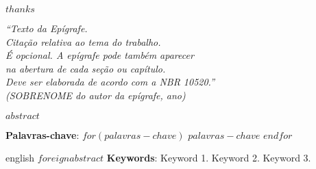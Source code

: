 \documentclass[
	12pt,				%
	oneside,			%
	a4paper,			%
	chapter=TITLE,		%
	section=TITLE,		%
	english,			%
	brazil				%
	]{abntex2}
\begin{document}
\begin{agradecimentos}
	$thanks$
\end{agradecimentos}

\begin{epigrafe}
	\vspace*{\fill}
	\begin{flushright}
		\textit{``Texto da Epígrafe.\\
			Citação relativa ao tema do trabalho.\\
			É opcional. A epígrafe pode também aparecer\\
			na abertura de cada seção ou capítulo.\\
			Deve ser elaborada de acordo com a NBR 10520.''\\
			(SOBRENOME do autor da epígrafe, ano)}
	\end{flushright}
\end{epigrafe}


\setlength{\absparsep}{18pt} %
\begin{resumo}
	\SingleSpacing
  $abstract$ 
  
  \textbf{Palavras-chave}: 
  $for(palavras-chave)$
  $palavras-chave$
  $endfor$
\end{resumo}

\begin{resumo}[Abstract]
	\SingleSpacing
	\begin{otherlanguage*}{english}
		$foreignabstract$
		\textbf{Keywords}: Keyword 1. Keyword 2. Keyword 3.
	\end{otherlanguage*}
\end{resumo}

% 
%
%  
\end{document}
